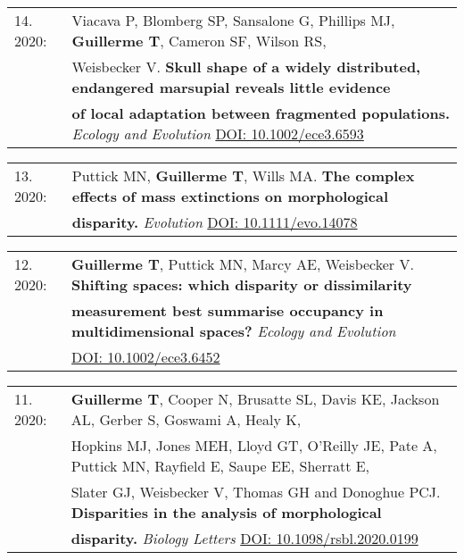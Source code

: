 \documentclass[10pt,a4paper]{article}
\begin{document}
{\begin{tabular}{ll}
14. 2020: & Viacava P, Blomberg SP, Sansalone G, Phillips MJ, \textbf{Guillerme T}, Cameron SF, Wilson RS,\\
      & Weisbecker V. \textbf{Skull shape of a widely distributed, endangered marsupial reveals little evidence}\\
      & \textbf{of local adaptation between fragmented populations.} \textit{Ecology and Evolution} \href{https://onlinelibrary.wiley.com/doi/full/10.1002/ece3.6593}{DOI: 10.1002/ece3.6593}\\
\end{tabular}
\bigskip

\begin{tabular}{ll}
13. 2020: & Puttick MN, \textbf{Guillerme T}, Wills MA. \textbf{The complex effects of mass extinctions on morphological}\\
          & \textbf{disparity.} \textit{Evolution} \href{https://onlinelibrary.wiley.com/doi/abs/10.1111/evo.14078}{DOI: 10.1111/evo.14078}\\
\end{tabular}
\bigskip

\begin{tabular}{ll}
12. 2020: & \textbf{Guillerme T}, Puttick MN, Marcy AE, Weisbecker V. \textbf{Shifting spaces: which disparity or dissimilarity}\\
      & \textbf{measurement best summarise occupancy in multidimensional spaces?} \textit{Ecology and Evolution}\\
      & \href{https://onlinelibrary.wiley.com/doi/full/10.1002/ece3.6452}{DOI: 10.1002/ece3.6452}\\
\end{tabular}
\bigskip

\begin{tabular}{ll}
11. 2020: & \textbf{Guillerme T}, Cooper N, Brusatte SL, Davis KE, Jackson AL, Gerber S, Goswami A, Healy K,\\
      & Hopkins MJ, Jones MEH, Lloyd GT, O’Reilly JE, Pate A, Puttick MN, Rayfield E, Saupe EE, Sherratt E,\\
      & Slater GJ, Weisbecker V, Thomas GH and Donoghue PCJ. \textbf{Disparities in the analysis of morphological}\\
      & \textbf{disparity.} \textit{Biology Letters} \href{https://royalsocietypublishing.org/doi/10.1098/rsbl.2020.0199}{DOI: 10.1098/rsbl.2020.0199}\\
\end{tabular}
\bigskip

}
\end{document}
